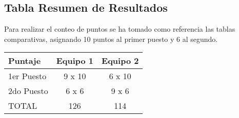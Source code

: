 \subsection{Tabla Resumen de Resultados}
Para realizar el conteo de puntos se ha tomado como referencia las tablas comparativas, asignando 10 puntos al primer puesto y 6 al segundo.

\begin{center}
\begin{tabular}{|lcc|} \hline
\footnotesize\textbf{Puntaje} & \footnotesize\textbf{Equipo 1} & \footnotesize\textbf{Equipo 2} \\\hline
1er Puesto & 9 x 10 & 6 x 10 \\\hline
2do Puesto & 6 x 6 & 9 x 6 \\\hline
TOTAL & 126 & 114 \\\hline
\end{tabular}
\end{center}
